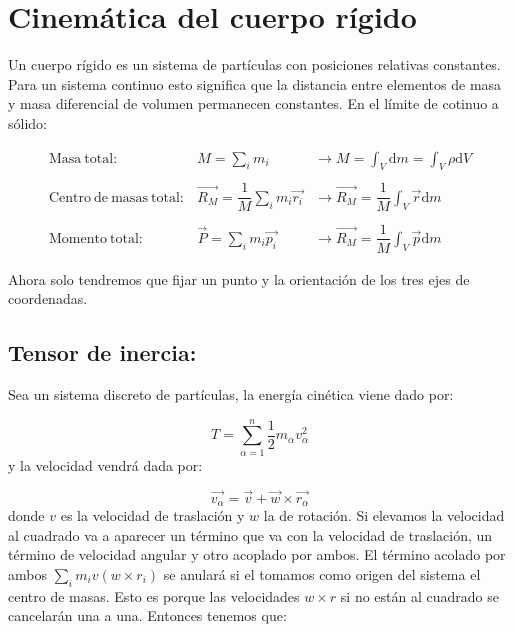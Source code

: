 \documentclass[12pt,a4paper]{book}
\newcommand{\D}{\mathrm{d}}
\begin{document}
\section{Cinemática del cuerpo rígido}

Un cuerpo rígido es un sistema de partículas con posiciones relativas constantes. Para un sistema continuo esto significa que la distancia entre elementos de masa y masa diferencial de volumen permanecen constantes. En el límite de cotinuo a sólido:

\begin{equation}
\begin{array}{rll}
\mathrm{Masa \ total:}  &  M = \sum_i m_i  & \longrightarrow M = \int_V \D m  = \int_V \rho \D V \\ \\
\mathrm{Centro  \ de \ masas \ total:}  &   \vec{R_M} = \dfrac{1}{M} \sum_i m_i \vec{r_i}  & \longrightarrow \vec{R_M} = \dfrac{1}{M} \int_V \vec{r} \D m  \\  \\
\mathrm{Momento \ total:}  &  \vec{P} =  \sum_i m_i \vec{p_i}  & \longrightarrow \vec{R_M} = \dfrac{1}{M} \int_V \vec{p} \D m 
\end{array}
\end{equation}

Ahora solo tendremos que fijar un punto y la orientación de los tres ejes de coordenadas. \\

\subsection{Tensor de inercia:}

Sea un sistema discreto de partículas, la energía cinética viene dado por:

$$ T = \sum_{\alpha=1}^n \dfrac{1}{2} m_\alpha v_\alpha^2 $$
y la velocidad vendrá dada por:

\begin{equation}
\vec{v_\alpha} = \vec{v} + \vec{w} \times \vec{r_\alpha}
\end{equation}
donde $v$ es la velocidad de traslación y $w$ la de rotación. Si elevamos la velocidad al cuadrado va a aparecer un término que va con la velocidad de traslación, un término de velocidad angular y otro acoplado por ambos. El término acolado por ambos $\sum_i m_i v (w \times r_i)$ se anulará si el tomamos como origen del sistema el centro de masas. Esto es porque las velocidades $w \times r$ si no están al cuadrado se cancelarán una a una. Entonces tenemos que:
\end{document}
